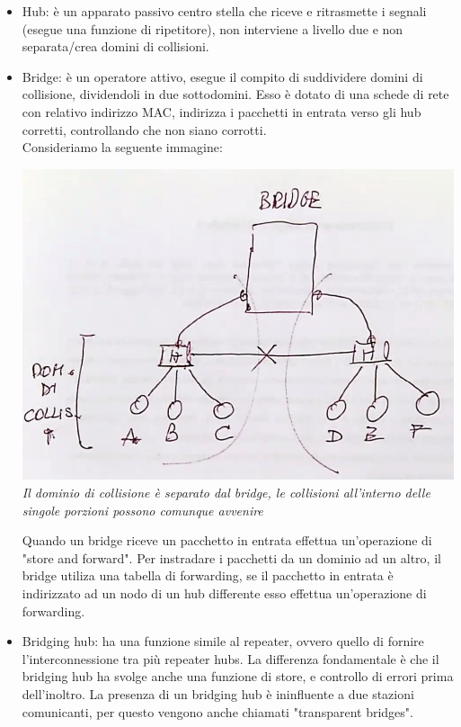 \documentclass[11pt, oneside]{article}   	%
\begin{document}
\begin{itemize}
\item Hub: è un apparato passivo centro stella che riceve e ritrasmette i segnali (esegue una funzione di ripetitore), non interviene a livello due e non separata/crea domini di collisioni.
\item Bridge: è un operatore attivo, esegue il compito di suddividere domini di collisione, dividendoli in due sottodomini. Esso è dotato di una schede di rete con relativo indirizzo MAC, indirizza i pacchetti in entrata verso gli hub corretti, controllando che non siano corrotti.\\
Consideriamo la seguente immagine:
\begin{center}
\includegraphics[scale=0.5]{bridge}\\
\emph{Il dominio di collisione è separato dal bridge, le collisioni all'interno delle singole porzioni possono comunque avvenire}
\end{center}
Quando un bridge riceve un pacchetto in entrata effettua un'operazione di "store and forward". 
Per instradare i pacchetti da un dominio ad un altro, il bridge utiliza una tabella di forwarding, se il pacchetto in entrata è indirizzato ad un nodo di un hub differente esso effettua un'operazione di forwarding.
\item Bridging hub: ha una funzione simile al repeater, ovvero quello di fornire l'interconnessione tra più repeater hubs. La differenza fondamentale è che il bridging hub ha svolge anche una funzione di store, e controllo di errori prima dell'inoltro. La presenza di un bridging hub è ininfluente a due stazioni comunicanti, per questo vengono anche chiamati "transparent bridges". \\

\end{itemize}
\end{document}
